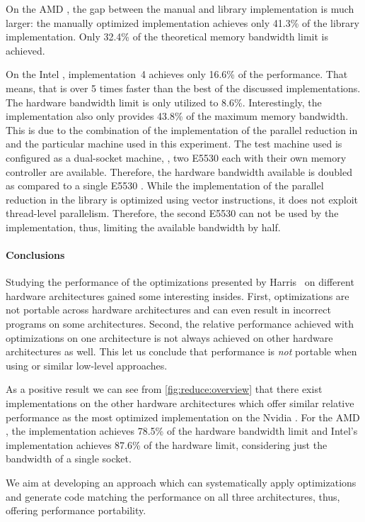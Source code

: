 On the AMD \GPU, the gap between the manual and library implementation is much larger:
the manually optimized implementation achieves only 41.3\% of the \clBLAS library implementation.
Only 32.4\% of the theoretical memory bandwidth limit is achieved.

On the Intel \CPU, implementation~4 achieves only 16.6\% of the \MKL performance.
That means, that \MKL is over 5 times faster than the best of the discussed implementations.
The hardware bandwidth limit is only utilized to 8.6\%.
Interestingly, the \MKL implementation also only provides 43.8\% of the maximum memory bandwidth.
This is due to the combination of the implementation of the parallel reduction in \MKL and the particular machine used in this experiment.
The test machine used is configured as a dual-socket machine, \ie, two E5530 \CPUs each with their own memory controller are available.
Therefore, the hardware bandwidth available is doubled as compared to a single E5530 \CPU.
While the implementation of the parallel reduction in the \MKL library is optimized using vector instructions, it does not exploit thread-level parallelism.
Therefore, the second E5530 \CPU can not be used by the implementation, thus, limiting the available bandwidth by half.

\paragraph{Conclusions}
Studying the performance of the optimizations presented by Harris~\cite{Harris2007} on different hardware architectures gained some interesting insides.
First, optimizations are not portable across hardware architectures and can even result in incorrect programs on some architectures.
Second, the relative performance achieved with optimizations on one architecture is not always achieved on other hardware architectures as well.
This let us conclude that performance is \emph{not} portable when using \OpenCL or similar low-level approaches.

As a positive result we can see from \autoref{fig:reduce:overview} that there exist implementations on the other hardware architectures which offer similar relative performance as the most optimized implementation on the Nvidia \GPU.
For the AMD \GPU, the \clBLAS implementation achieves 78.5\% of the hardware bandwidth limit and Intel's \MKL implementation achieves 87.6\% of the hardware limit, considering just the bandwidth of a single \CPU socket.

We aim at developing an approach which can systematically apply optimizations and generate code matching the performance on all three architectures, thus, offering performance portability.

